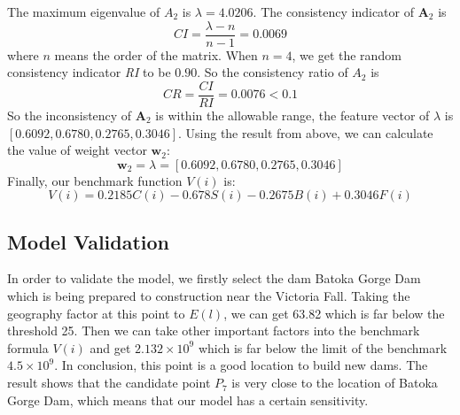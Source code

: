 \documentclass{mcmthesis}
\begin{document}
The maximum eigenvalue of $A_{2}$ is $\lambda = 4.0206$. The consistency indicator of $\textbf{A}_2$ is \[\mathit{CI} = \frac{\lambda - n}{n - 1} = 0.0069\]
where $n$ means the order of the matrix. When $n = 4$, we get the random consistency indicator  \textit{RI} to be $0.90$. So the consistency ratio of $A_{2}$ is \[\mathit{CR} = \frac{\mathit{CI}}{\mathit{RI}} = 0.0076 < 0.1 \]
So the inconsistency of $\textbf{A}_2$ is within the allowable range, the feature vector of $\lambda$ is $\left[0.6092, 0.6780, 0.2765, 0.3046\right]$.
\indent Using the result from above, we can calculate the value of weight vector $\textbf{w}_{2}$:
\begin{equation}
\textbf{w}_{2} = \lambda = \left[0.6092, 0.6780, 0.2765, 0.3046\right]
\end{equation}
\indent Finally, our benchmark function $V(i)$ is:
\begin{equation}
V(i) = 0.2185C(i) - 0.678S(i) - 0.2675B(i) + 0.3046F(i)
\end{equation}
\subsection{Model Validation}
In order to validate the model, we firstly select the dam Batoka Gorge Dam which is being prepared to construction near the Victoria Fall. Taking the geography factor at this point to $E(l)$, we can get 63.82 which is far below the threshold 25. Then we can take other important factors into the benchmark formula $V(i)$ and get $2.132\times10^9$ which is far below the limit of the benchmark $4.5\times10^{9}$. In conclusion, this point is a good location to build new dams. The result shows that the candidate point $P_7$ is very close to the location of Batoka Gorge Dam, which means that our model has a certain sensitivity.
\end{document}
